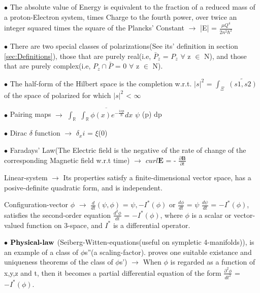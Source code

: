 \documentclass[a4paper, 10pt, onepage]{elegantbook}
\begin{document}
{$\bullet$ The absolute value of Energy is equivalent to the fraction of a reduced mass of a proton-Electron system, 
times Charge to the fourth power,
over twice an integer squared times the square of the Plancks' Constant $\longrightarrow$ |E| = $\frac{\mu Q^4}{{2n^2} 
\hbar^2}$  
  
$\bullet$ There are two special classes of polarizations(See its' definition in section \ref{sec:Definitions}), those 
that are purely real(i.e, $\bar P_z$ = $P_z$ $\forall$ z $\in$ N),
and those that are purely complex(i.e, $P_z \cap \bar P$ = {0} $\forall$ z $\in$ N). 
  
$\bullet$ The half-form of the Hilbert space is the completion w.r.t. $\vert s \vert^2$ = $\int_\Xi$ 
${\widetilde{(s1,s2)}}$  of the space
of polarized for which $\vert s \vert^2$ < $\infty$  
  
$\bullet$ Pairing maps $\longrightarrow$ $\int_\mathbb R$ $\overline {\int_\mathbb {R} \phi (x) e^{- 
\frac{{ixp}}{\hbar}} dx}$ $\psi$ (p) dp   
 
$\bullet$ Dirac $\delta$ function $\longrightarrow$ $\delta_xi$ = $\xi$(0)  

$\bullet$ Faradays' Law(The Electric field is the negative of the rate of change of the corresponding Magnetic field 
w.r.t time) $\longrightarrow$ $curl \mathbf E$ = - $\frac{\partial \mathbf B}{\partial t}$ 
 
Linear-system $\longrightarrow$ Its properties satisfy a finite-dimensional vector space, has a 
posive-definite quadratic form,
and is independent. 
 
Configuration-vector $\phi$ $\longrightarrow$ $\frac{d}{dt}(\psi, \phi)$ = $\psi, 
{-I}^*(\phi)$ or $\frac{d\phi}{dt}$ = $\psi$ $\frac{d\psi}{dt}$ = $-I^*(\phi)$,
satisfies the second-order equation $\frac{d^2\phi}{dt}$ = ${-I^*(\phi)}$, where $\phi$ is a scalar
or vector-valued function on 3-space, and ${I^*}$ is a differential operator. 
 
$\bullet$ $\mathbf{\textbf{Physical-law\index{Physical-law}}}$ 
(Seiberg-Witten-equations(useful on sympletic 4-manifolds)), is an example of a class 
of $\phi$s''(a scaling-factor). proves one suitable existance and 
uniqueness theorems of the class of $\phi$s') $\longrightarrow$ When $\phi$ is regarded as a function of x,y,z and t, 
then it becomes a partial differential equation of the form $\frac{\partial^2 \phi}{dt^2}$ = ${-I^*}(\phi)$. 
 
}
\end{document}
